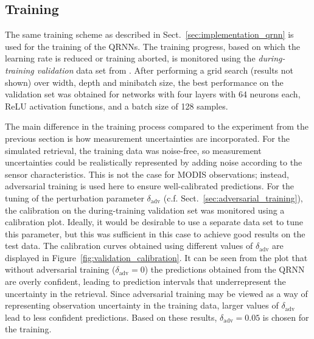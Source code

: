 \documentclass[journal abbreviation, manuscript]{copernicus}
\begin{document}
\subsection{Training}

The same training scheme as described in Sect.~\ref{sec:implementation_qrnn} is
used for the training of the QRNNs. The training progress, based on which the
learning rate is reduced or training aborted, is monitored using the
\textit{during-training validation} data set from \cite{hakansson}. After
performing a grid search (results not shown) over width, depth and minibatch
size, the best performance on the validation set was obtained for networks with
four layers with 64 neurons each, ReLU activation functions, and a batch size of
128 samples.

The main difference in the training process compared to the experiment from the
previous section is how measurement uncertainties are incorporated. For the
simulated retrieval, the training data was noise-free, so measurement
uncertainties could be realistically represented by adding noise according to
the sensor characteristics. This is not the case for MODIS observations;
instead, adversarial training is used here to ensure well-calibrated
predictions. For the tuning of the perturbation parameter $\delta_{\text{adv}}$
(c.f. Sect.~\ref{sec:adversarial_training}), the calibration on the
during-training validation set was monitored using a calibration plot. Ideally,
it would be desirable to use a separate data set to tune this parameter, but
this was sufficient in this case to achieve good results on the test data. The
calibration curves obtained using different values of $\delta_\text{adv}$ are
displayed in Figure~\ref{fig:validation_calibration}. It can be seen from the
plot that without adversarial training ($\delta_\text{adv} = 0$) the predictions
obtained from the QRNN are overly confident, leading to prediction intervals
that underrepresent the uncertainty in the retrieval. Since adversarial training
may be viewed as a way of representing observation uncertainty in the training
data, larger values of $\delta_\text{adv}$ lead to less confident predictions.
Based on these results, $\delta_\text{adv} = 0.05$ is chosen for the training.
\end{document}
